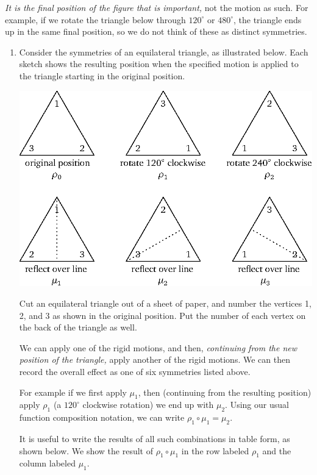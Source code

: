 \textit{It is the final position of the figure that is important,} not the motion as such. For example, if we rotate the triangle below through $120^\circ$ or $480^\circ$, the triangle ends up in the same final position, so we do not think of these as distinct symmetries.

\begin{enumerate}
    \item Consider the symmetries of an equilateral triangle, as illustrated below. Each sketch shows the resulting position when the specified motion is applied to the triangle starting in the original position.
\begin{center}
    \includegraphics{wstriangles.eps}
\end{center}
    Cut an equilateral triangle out of a sheet of paper, and number the vertices 1, 2, and 3 as shown in the original position. Put the number of each vertex on the back of the triangle as well.

    We can apply one of the rigid motions, and then, \textit{continuing from the new position of the triangle,} apply another of the rigid motions. We can then record the overall effect as one of six symmetries listed above.

    For example if we first apply $\mu_1$, then (continuing from the resulting position) apply $\rho_1$ (a $120^\circ$ clockwise rotation) we end up with $\mu_2$. Using our usual function composition notation, we can write $\rho_1 \circ \mu_1 = \mu_2$.

    It is useful to write the results of all such combinations in table form, as shown below. We show the result of $\rho_1 \circ \mu_1$ in the row labeled $\rho_1$ and the column labeled $\mu_1$.


\end{enumerate}
